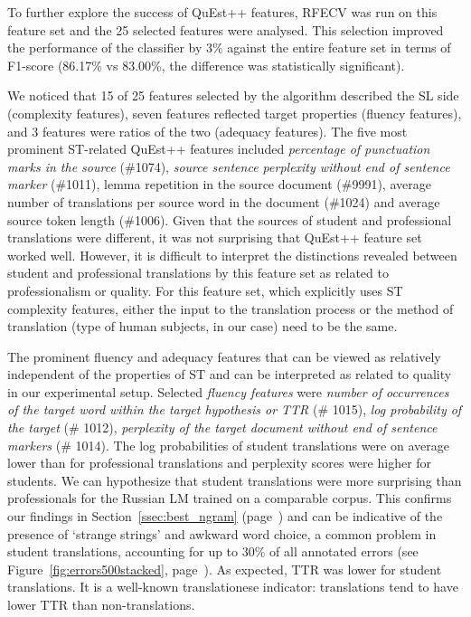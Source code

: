 To further explore the success of QuEst++ features, RFECV was run on this feature set and the 25 selected features were analysed. This selection improved the performance of the classifier by 3\% against the entire feature set in terms of F1-score (86.17\% vs 83.00\%, the difference was statistically significant). 

We noticed that 15 of 25 features selected by the algorithm described the SL side (complexity features), seven features reflected target properties (fluency features), and 3 features were ratios of the two (adequacy features). 
The five most prominent ST-related QuEst++ features included \textit{percentage of punctuation marks in the source} (\#1074), \textit{source sentence perplexity without end of sentence marker} (\#1011), lemma repetition in the source document (\#9991), average number of translations per source word in the document (\#1024) and average source token length (\#1006).
Given that the sources of student and professional translations were different, it was not surprising that QuEst++ feature set worked well. However, it is difficult to interpret the  distinctions revealed between student and professional translations by this feature set as related to professionalism or quality. For this feature set, which explicitly uses ST complexity features, either the input to the translation process or the method of translation (type of human subjects, in our case) need to be the same.

The prominent fluency and adequacy features that can be viewed as relatively independent of the properties of ST and can be interpreted as related to quality in our experimental setup. Selected \textit{fluency features} were \textit{number of occurrences of the target word within the target hypothesis or TTR} (\# 1015), \textit{log probability of the target} (\# 1012), \textit{perplexity of the target document without end of sentence markers} (\# 1014). 
The log probabilities of student translations were on average lower than for professional translations and perplexity scores were higher for students. We can hypothesize that student translations were more surprising than professionals for the Russian LM trained on a comparable corpus. This confirms our findings in Section~\ref{ssec:best_ngram} (page~\pageref{pg:stu_more_surprising_than_pro}) and can be indicative of the presence of `strange strings' and awkward word choice, a common problem in student translations, accounting for up to 30\% of all annotated errors (see Figure~\ref{fig:errors500stacked}, page~\pageref{fig:errors500stacked}).
As expected, TTR was lower for student translations. It is a well-known translationese indicator: translations tend to have lower TTR than non-translations. %

